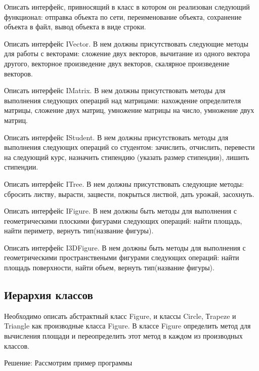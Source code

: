 \task Описать интерфейс, привносящий в класс в котором он реализован
следующий функционал: отправка объекта по сети, переименование
объекта, сохранение объекта в файл, вывод объекта в виде строки.

\task Описать интерфейс IVector. В нем должны присутствовать следующие
методы для работы с векторами: сложение двух векторов, вычитание из
одного вектора другого, векторное произведение двух векторов,
скалярное произведение векторов.

\task Описать интерфейс IMatrix. В нем должны присутствовать методы
для выполнения следующих операций над матрицами: нахождение
определителя матрицы, сложение двух матриц, умножение матрицы на
число, умножение двух матриц.

\task Описать интерфейс IStudent. В нем должны присутствовать методы
для выполнения следующих операций со студентом: зачислить, отчислить,
перевести на следующий курс, назначить стипендию (указать размер
стипендии), лишить стипендии.

\task Описать интерфейс ITree. В нем должны присутствовать следующие
методы: сбросить листву, вырасти, зацвести, покрыться листвой, дать
урожай, засохнуть.

\task Описать интерфейс IFigure. В нем должны быть методы для
выполнения с геометрическими плоскими фигурами следующих операций:
найти площадь, найти периметр, вернуть тип(название фигуры).

\task Описать интерфейс I3DFigure. В нем должны быть методы для
выполнения с геометрическими пространствеными фигурами следующих
операций: найти площадь поверхности, найти объем, вернуть тип(название
фигуры).

\subsection{Иерархия классов}

Необходимо описать абстрактный класс Figure, и классы Circle, Тrapeze
и Triangle как производные класса Figure. В классе Figure определить
метод для вычисления площади и переопределить этот метод в каждом из
производных классов.

Решение: Рассмотрим пример программы




